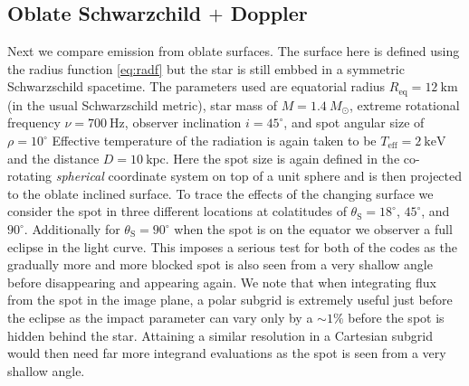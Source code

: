 \documentclass[iop, usenatbib]{emulateapj}
\newcommand{\sch}{Schwarzschild }
\newcommand{\Msun}{\ensuremath{M_{\odot}}}
\begin{document}
\subsection{Oblate Schwarzchild $+$ Doppler}

Next we compare emission from oblate surfaces.
The surface here is defined using the radius function \eqref{eq:radf} but the star is still embbed in a symmetric \sch spacetime.
The parameters used are equatorial radius $R_{\mathrm{eq}} = 12~\mathrm{km}$ (in the usual \sch metric), star mass of $M = 1.4~\Msun$, extreme rotational frequency $\nu = 700~\mathrm{Hz}$, observer inclination $i=45^{\circ}$, and spot angular size of $\rho = 10^{\circ}$
Effective temperature of the radiation is again taken to be $T_{\mathrm{eff}} = 2~\mathrm{keV}$ and the distance $D = 10~\mathrm{kpc}$.
Here the spot size is again defined in the co-rotating \textit{spherical} coordinate system on top of a unit sphere and is then projected to the oblate inclined surface.
To trace the effects of the changing surface we consider the spot in three different locations at colatitudes of $\theta_{\mathrm{S}} = 18^{\circ}$, $45^{\circ}$, and $90^{\circ}$.
Additionally for $\theta_{\mathrm{S}} = 90^{\circ}$ when the spot is on the equator we observer a full eclipse in the light curve.
This imposes a serious test for both of the codes as the gradually more and more blocked spot is also seen from a very shallow angle before disappearing and appearing again.
We note that when integrating flux from the spot in the image plane, a polar subgrid is extremely useful just before the eclipse as the impact parameter can vary only by a $\sim1\%$ before the spot is hidden behind the star.
Attaining a similar resolution in a Cartesian subgrid would then need far more integrand evaluations as the spot is seen from a very shallow angle.

\end{document}
